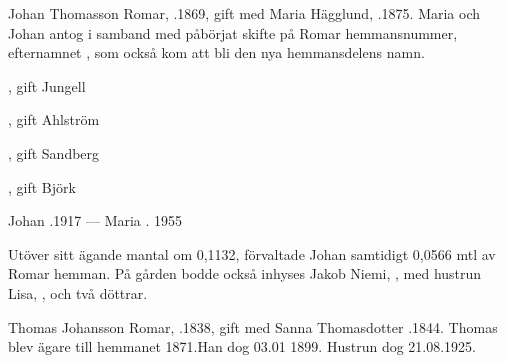 %
Johan Thomasson Romar, .1869, gift med Maria Hägglund, .1875. Maria och Johan antog i samband med påbörjat skifte på Romar hemmansnummer, efternamnet , som också kom att bli den nya hemmansdelens namn.
\begin{jhchildren}
  \item {}
  \item {}, gift Jungell
  \item {}, gift Ahlström
  \item {}, gift Sandberg
  \item {}
  \item {}, gift Björk
\end{jhchildren}

Johan .1917  ---  Maria . 1955

Utöver sitt ägande mantal om 0,1132, förvaltade Johan samtidigt 0,0566 mtl av Romar hemman. På gården bodde också inhyses Jakob Niemi, , med hustrun Lisa, , och två döttrar.


%
Thomas Johansson Romar, .1838, gift med Sanna Thomasdotter .1844.
Thomas blev ägare till hemmanet 1871.Han dog 03.01 1899. Hustrun dog 21.08.1925.
\begin{jhchildren}
  \item {}
  \item {}
  \item {}
  \item {}
  \item {}
  \item {}
  \item {}
  \item {}
\end{jhchildren}


